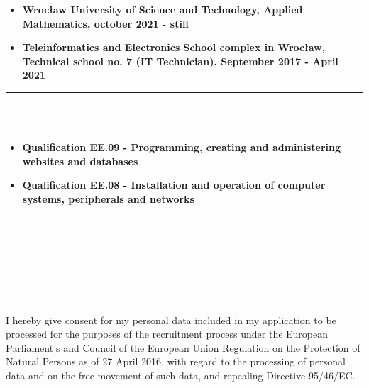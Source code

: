 \documentclass[10pt]{article}
\begin{document}
\begin{minipage}[t]{0.60\textwidth}
        \begin{itemize}[leftmargin=*]
            \setlength{\parskip}{0pt}
            \item \textbf{Wrocław University of Science and Technology, Applied Mathematics, october 2021 - still}
            \item \textbf{Teleinformatics and Electronics School complex in Wrocław, \\ Technical school no. 7 (IT Technician), September 2017 - April 2021} 
        \end{itemize}
        \rule{11cm}{1pt} \\ \\
        \fontsize{10pt}{10pt}
        \begin{itemize}[leftmargin=*]
            \setlength{\parskip}{0pt}
            \item \textbf{Qualification EE.09 - Programming, creating and administering \\ websites and databases}
            \item \textbf{Qualification EE.08 - Installation and operation of computer systems, peripherals and networks}
        \end{itemize}
        \rule{0pt}{0pt} \\ \\ \\ \\ \\ \\ \\ 
        \fontsize{7pt}{5pt}\selectfont  
        I hereby give consent for my personal data included in my application to be processed for 
        the purposes of the recruitment process under the European Parliament's and Council of the 
        European Union Regulation on the Protection of Natural Persons as of 27 April 2016, with 
        regard to the processing of personal data and on the free movement of such data, and repealing 
        Directive 95/46/EC.
    \end{minipage}
\end{document}
